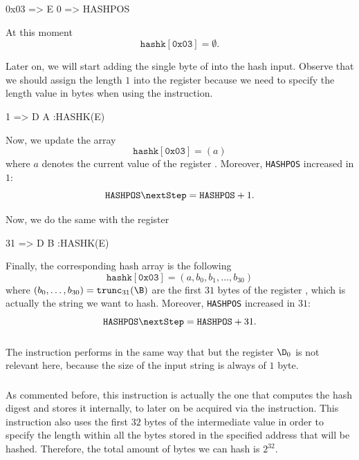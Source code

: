 \begin{zkasm}
0x03 => E
0 => HASHPOS
\end{zkasm}

At this moment
\[
\texttt{hashk}[\texttt{0x03}] = \emptyset.
\]

Later on, we will start adding the single byte of \A into the hash input. Observe that we should assign the length $1$ into the register \D because we need to specify the length value in bytes when using the \HASHK instruction. 

\begin{zkasm}
1 => D
A				:HASHK(E)
\end{zkasm}

Now, we update the array
\[
\texttt{hashk}[\texttt{0x03}] = (a)
\]
where $a$ denotes the current value of the register \A. Moreover, \texttt{HASHPOS} increased in $1$:
\[
\texttt{HASHPOS} \nextStep = \texttt{HASHPOS} + 1.
\]

Now, we do the same with the register \B

\begin{zkasm}
31 => D
B				:HASHK(E)
\end{zkasm}

Finally, the corresponding hash array is the following
\[
\texttt{hashk}[\texttt{0x03}] = (a, b_0, b_1, \dots, b_{30})
\]
where $(b_0, \dots, b_{30}) = \mathtt{trunc}_{31}(\B)$ are the first $31$ bytes of the register \B, which is actually the string we want to hash. Moreover, \texttt{HASHPOS} increased in $31$:
\[
\texttt{HASHPOS} \nextStep = \texttt{HASHPOS} + 31.
\]


\subsubsection{\HASHKONE}

The instruction \HASHKONE performs in the same way that \HASHK but the register $\D_0$ is not relevant here, because the size of the input string is always of $1$ byte. 


\subsubsection{\HASHKLEN}

As commented before, this instruction is actually the one that computes the hash digest and stores it internally, to later on be acquired via the \HASHKDIGEST instruction. This instruction also uses the first $32$ bytes of the \op intermediate value in order to specify the length within all the bytes stored in the specified address that will be hashed. Therefore, the total amount of bytes we can hash is $2^{32}$. 

